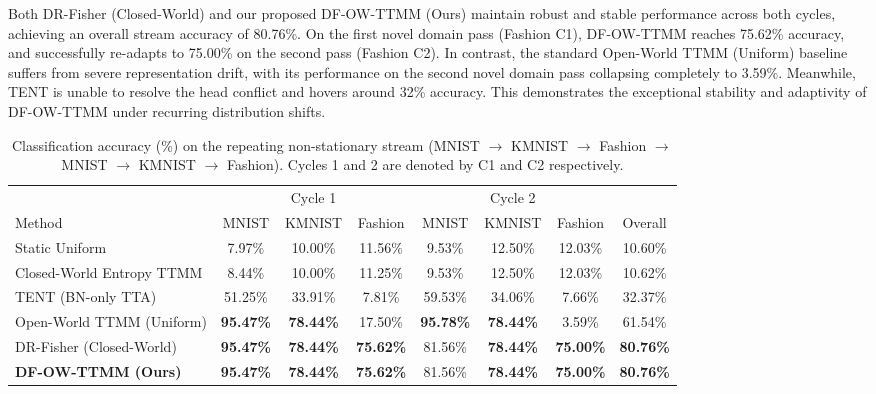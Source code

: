 \documentclass{article}
\theoremstyle{plain}
\theoremstyle{definition}
\theoremstyle{remark}
\begin{document}
Both DR-Fisher (Closed-World) and our proposed DF-OW-TTMM (Ours) maintain robust and stable performance across both cycles, achieving an overall stream accuracy of 80.76\%. On the first novel domain pass (Fashion C1), DF-OW-TTMM reaches 75.62\% accuracy, and successfully re-adapts to 75.00\% on the second pass (Fashion C2). In contrast, the standard Open-World TTMM (Uniform) baseline suffers from severe representation drift, with its performance on the second novel domain pass collapsing completely to 3.59\%. Meanwhile, TENT is unable to resolve the head conflict and hovers around 32\% accuracy. This demonstrates the exceptional stability and adaptivity of DF-OW-TTMM under recurring distribution shifts.

\begin{table}[t]
\caption{Classification accuracy (\%) on the repeating non-stationary stream (MNIST $\rightarrow$ KMNIST $\rightarrow$ Fashion $\rightarrow$ MNIST $\rightarrow$ KMNIST $\rightarrow$ Fashion). Cycles 1 and 2 are denoted by C1 and C2 respectively.}
\label{tab:repeating_results}
\vskip 0.15in
\begin{center}
\begin{footnotesize}
\setlength{\tabcolsep}{4.0pt}
\begin{tabular}{lccccccc}
\toprule
 & \multicolumn{3}{c}{Cycle 1} & \multicolumn{3}{c}{Cycle 2} & \\
\cmidrule(r){2-4} \cmidrule(l){5-7}
Method & MNIST & KMNIST & Fashion & MNIST & KMNIST & Fashion & Overall \\
\midrule
Static Uniform & 7.97\% & 10.00\% & 11.56\% & 9.53\% & 12.50\% & 12.03\% & 10.60\% \\
Closed-World Entropy TTMM & 8.44\% & 10.00\% & 11.25\% & 9.53\% & 12.50\% & 12.03\% & 10.62\% \\
TENT (BN-only TTA) & 51.25\% & 33.91\% & 7.81\% & 59.53\% & 34.06\% & 7.66\% & 32.37\% \\
Open-World TTMM (Uniform) & \textbf{95.47\%} & \textbf{78.44\%} & 17.50\% & \textbf{95.78\%} & \textbf{78.44\%} & 3.59\% & 61.54\% \\
DR-Fisher (Closed-World) & \textbf{95.47\%} & \textbf{78.44\%} & \textbf{75.62\%} & 81.56\% & \textbf{78.44\%} & \textbf{75.00\%} & \textbf{80.76\%} \\
\midrule
\textbf{DF-OW-TTMM (Ours)} & \textbf{95.47\%} & \textbf{78.44\%} & \textbf{75.62\%} & 81.56\% & \textbf{78.44\%} & \textbf{75.00\%} & \textbf{80.76\%} \\
\bottomrule
\end{tabular}
\end{footnotesize}
\end{center}
\vskip -0.1in
\end{table}
\end{document}

